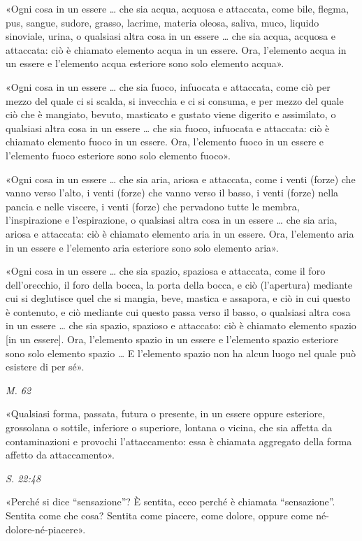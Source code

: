 «Ogni cosa in un essere … che sia acqua, acquosa e attaccata, come bile,
flegma, pus, sangue, sudore, grasso, lacrime, materia oleosa, saliva,
muco, liquido sinoviale, urina, o qualsiasi altra cosa in un essere …
che sia acqua, acquosa e attaccata: ciò è chiamato elemento acqua in un
essere. Ora, l’elemento acqua in un essere e l’elemento acqua esteriore
sono solo elemento acqua».


«Ogni cosa in un essere … che sia fuoco, infuocata e attaccata, come ciò
per mezzo del quale ci si scalda, si invecchia e ci si consuma, e per
mezzo del quale ciò che è mangiato, bevuto, masticato e gustato viene
digerito e assimilato, o qualsiasi altra cosa in un essere … che sia
fuoco, infuocata e attaccata: ciò è chiamato elemento fuoco in un
essere. Ora, l’elemento fuoco in un essere e l’elemento fuoco esteriore
sono solo elemento fuoco».


«Ogni cosa in un essere … che sia aria, ariosa e attaccata, come i venti
(forze) che vanno verso l’alto, i venti (forze) che vanno verso il
basso, i venti (forze) nella pancia e nelle viscere, i venti (forze) che
pervadono tutte le membra, l’inspirazione e l’espirazione, o qualsiasi
altra cosa in un essere … che sia aria, ariosa e attaccata: ciò è
chiamato elemento aria in un essere. Ora, l’elemento aria in un essere e
l’elemento aria esteriore sono solo elemento aria».


«Ogni cosa in un essere … che sia spazio, spaziosa e attaccata, come il
foro dell’orecchio, il foro della bocca, la porta della bocca, e ciò
(l’apertura) mediante cui si deglutisce quel che si mangia, beve,
mastica e assapora, e ciò in cui questo è contenuto, e ciò mediante cui
questo passa verso il basso, o qualsiasi altra cosa in un essere … che
sia spazio, spazioso e attaccato: ciò è chiamato elemento spazio [in un
essere]. Ora, l’elemento spazio in un essere e l’elemento spazio
esteriore sono solo elemento spazio … E l’elemento spazio non ha alcun
luogo nel quale può esistere di per sé».


\emph{M. 62}


«Qualsiasi forma, passata, futura o presente, in un essere oppure
esteriore, grossolana o sottile, inferiore o superiore, lontana o
vicina, che sia affetta da contaminazioni e provochi l’attaccamento:
essa è chiamata aggregato della forma affetto da attaccamento».


\emph{S. 22:48}


«Perché si dice “sensazione”? È sentita, ecco perché è chiamata
“sensazione”. Sentita come che cosa? Sentita come piacere, come dolore,
oppure come né-dolore-né-piacere».


